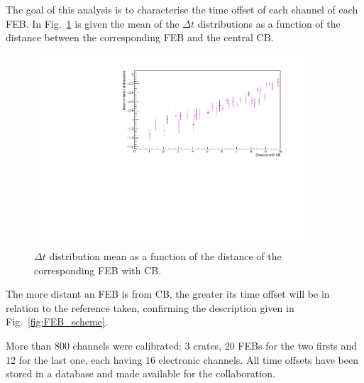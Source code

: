 The goal of this analysis is to characterise the time offset of each channel of each FEB.
In Fig.~\ref{fig:mean_distance} is given the mean of the $\Delta t$ distributions as a function of the distance between the corresponding FEB and the central CB.
\begin{figure}[h!]
  \centering
  \includegraphics[width=0.9\textwidth]{commissioning/fig_commissioning/mean_distance.pdf}
  \caption{$\Delta t$ distribution mean as a function of the distance of the corresponding FEB with CB.
    \label{fig:mean_distance}}
\end{figure}
The more distant an FEB is from CB, the greater its time offset will be in relation to the reference taken, confirming the description given in Fig.~\ref{fig:FEB_scheme}.

More than $800$ channels were calibrated: $3$ crates, $20$ FEBs for the two firsts and $12$ for the last one, each having $16$ electronic channels.
All time offsets have been stored in a database and made available for the collaboration.






